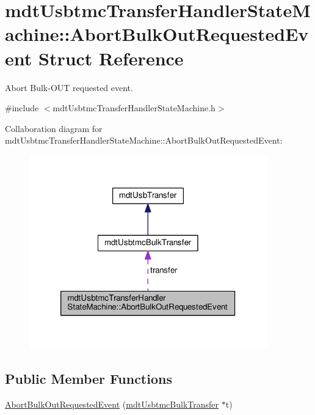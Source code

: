 \hypertarget{structmdt_usbtmc_transfer_handler_state_machine_1_1_abort_bulk_out_requested_event}{\section{mdt\-Usbtmc\-Transfer\-Handler\-State\-Machine\-:\-:Abort\-Bulk\-Out\-Requested\-Event Struct Reference}
\label{structmdt_usbtmc_transfer_handler_state_machine_1_1_abort_bulk_out_requested_event}
}


Abort Bulk-\/\-O\-U\-T requested event.  




{\ttfamily \#include $<$mdt\-Usbtmc\-Transfer\-Handler\-State\-Machine.\-h$>$}



Collaboration diagram for mdt\-Usbtmc\-Transfer\-Handler\-State\-Machine\-:\-:Abort\-Bulk\-Out\-Requested\-Event\-:\nopagebreak
\begin{figure}[H]
\begin{center}
\leavevmode
\includegraphics[width=292pt]{structmdt_usbtmc_transfer_handler_state_machine_1_1_abort_bulk_out_requested_event__coll__graph}
\end{center}
\end{figure}
\subsection*{Public Member Functions}
\begin{DoxyCompactItemize}
\item 
\hyperlink{structmdt_usbtmc_transfer_handler_state_machine_1_1_abort_bulk_out_requested_event_a58ae92d0b040033461710ef87789104c}{Abort\-Bulk\-Out\-Requested\-Event} (\hyperlink{classmdt_usbtmc_bulk_transfer}{mdt\-Usbtmc\-Bulk\-Transfer} $\ast$t)
\end{DoxyCompactItemize}
